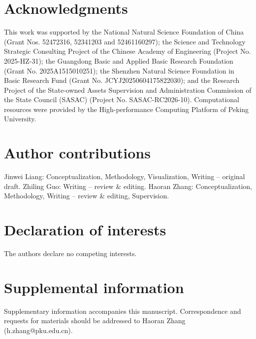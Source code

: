 \documentclass[11pt,a4paper]{article}
\begin{document}
\section*{Acknowledgments}

This work was supported by the National Natural Science Foundation of China (Grant Nos. 52472316, 52341203 and 52461160297); the Science and Technology Strategic Consulting Project of the Chinese Academy of Engineering (Project No. 2025-HZ-31); the Guangdong Basic and Applied Basic Research Foundation (Grant No. 2025A1515010251); the Shenzhen Natural Science Foundation in Basic Research Fund (Grant No. JCYJ20250604175822030); and the Research Project of the State-owned Assets Supervision and Administration Commission of the State Council (SASAC) (Project No. SASAC-RC2026-10). Computational resources were provided by the High-performance Computing Platform of Peking University.

\section*{Author contributions}

Jinwei Liang: Conceptualization, Methodology, Visualization, Writing -- original draft. Zhiling Guo: Writing -- review \& editing. Haoran Zhang: Conceptualization, Methodology, Writing -- review \& editing, Supervision.

\section*{Declaration of interests}

The authors declare no competing interests.

\section*{Supplemental information}

Supplementary information accompanies this manuscript. Correspondence and requests for materials should be addressed to Haoran Zhang (h.zhang@pku.edu.cn).

\clearpage
\end{document}
